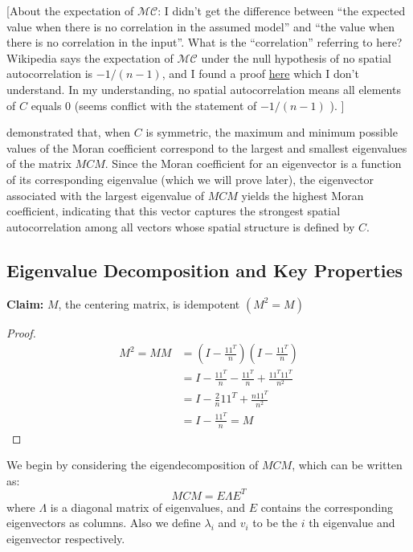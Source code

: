 \documentclass[12pt]{article}
\begin{document}
[About the expectation of \( \mathcal{M C} \): I didn't get the difference between ``the expected value when there is no correlation in the assumed model'' and ``the value when there is no correlation in the input''. What is the ``correlation'' referring to here? Wikipedia says the expectation of \( \mathcal{M C} \) under the null hypothesis of no spatial autocorrelation is \( -1 / (n - 1) \), and I found a proof \href{https://stats.stackexchange.com/questions/567411/expectation-and-variance-of-morans-i-under-the-null}{here} which I don't understand. In my understanding, no spatial autocorrelation means all elements of \( C \) equals 0 (seems conflict with the statement of \( -1 / (n - 1) \) ). ]


\citet{de1984extreme} demonstrated that, when \( C \) is symmetric, the maximum and minimum possible values of the Moran coefficient correspond to the largest and smallest eigenvalues of the matrix \( MCM \). Since the Moran coefficient for an eigenvector is a function of its corresponding eigenvalue (which we will prove later), the eigenvector associated with the largest eigenvalue of \( MCM \) yields the highest Moran coefficient, indicating that this vector captures the strongest spatial autocorrelation among all vectors whose spatial structure is defined by \( C \).

\subsection*{Eigenvalue Decomposition and Key Properties}

{\bf Claim:} \( M \), the centering matrix, is idempotent \( (M^2 = M) \)

\begin{proof}
  \begin{align*}
    M^2 = M M & = (I - \frac{1 1^T}{n}) (I - \frac{1 1^T}{n}) \\
              & = I - \frac{1 1^T}{n} - \frac{1 1^T}{n} + \frac{1 1^T 1 1^T}{n^2} \\
              & = I - \frac{2}{n} 1 1^T + \frac{n 1 1^T}{n^2} \\
              & = I - \frac{1 1^T}{n} = M
  \end{align*}
\end{proof}

We begin by considering the eigendecomposition of \( M C M \), which can be written as:
\[
  M C M = E \Lambda E^{T}
\]
where \( \Lambda \) is a diagonal matrix of eigenvalues, and \( E \) contains the corresponding eigenvectors as columns. Also we define \( \lambda_i \) and \( v_i \) to be the \( i \) th eigenvalue and eigenvector respectively.
\end{document}
